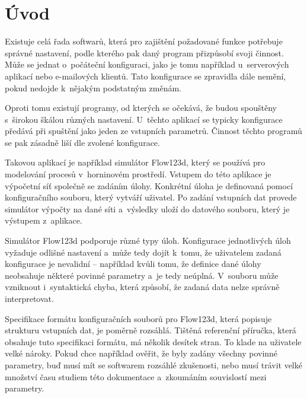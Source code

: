 \documentclass[FM,bw,DP]{tulthesis}
\begin{document}
\listoffigures
\clearpage



\printnoidxglossary[type=\acronymtype,title=Seznam zkratek]


\chapter*{Úvod}

Existuje celá řada softwarů, která pro zajištění požadované funkce potřebuje správné nastavení, podle kterého pak daný program přizpůsobí svoji činnost. Může se jednat o~počáteční konfiguraci, jako je tomu například u~serverových aplikací nebo e-mailových klientů. Tato konfigurace se zpravidla dále nemění, pokud nedojde k~nějakým podstatným změnám.

Oproti tomu existují programy, od kterých se očekává, že budou spouštěny s~širokou škálou různých nastavení. U~těchto aplikací se typicky konfigurace předává při spuštění jako jeden ze vstupních parametrů. Činnost těchto programů se pak zásadně liší dle zvolené konfigurace.

Takovou aplikací je například simulátor Flow123d, který se používá pro modelování procesů v~horninovém prostředí. Vstupem do této aplikace je výpočetní síť společně se zadáním úlohy. Konkrétní úloha je definovaná pomocí konfiguračního souboru, který vytváří uživatel. Po zadání vstupních dat provede simulátor výpočty na dané síti a~výsledky uloží do datového souboru, který je výstupem z~aplikace.

Simulátor Flow123d podporuje různé typy úloh. Konfigurace jednotlivých úloh vyžaduje odlišné nastavení a~může tedy dojít k~tomu, že uživatelem zadaná konfigurace je nevalidní -- například kvůli tomu, že definice dané úlohy neobsahuje některé povinné parametry a~je tedy neúplná. V~souboru může vzniknout i~syntaktická chyba, která způsobí, že zadaná data nelze správně interpretovat.

Specifikace formátu konfiguračních souborů pro Flow123d, která popisuje strukturu vstupních dat, je poměrně rozsáhlá. Tištěná referenční příručka, která obsahuje tuto specifikaci formátu, má několik desítek stran. To klade na uživatele velké nároky. Pokud chce například ověřit, že byly zadány všechny povinné parametry, buď musí mít se softwarem rozsáhlé zkušenosti, nebo musí trávit velké množství času studiem této dokumentace a~zkoumáním souvislostí mezi parametry.
\end{document}
